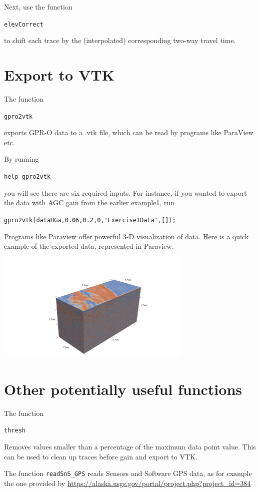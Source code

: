 \documentclass[11pt]{article}
\begin{document}
Next, use the function

\qquad \verb#elevCorrect#

to shift each trace by the (interpolated) corresponding two-way travel
time. 


\section{Export to VTK}

The function

\qquad \verb#gpro2vtk#

exports GPR-O data to a .vtk file, which can be
read by programs like ParaView etc.

By running

\qquad \verb#help gpro2vtk#

you will see there are six required inputs. For instance, if you
wanted to export the data with AGC gain from the earlier example1, run

\qquad \verb#gpro2vtk(dataHGa,0.06,0.2,0,'Exercise1Data',[]);#

Programs like Paraview offer powerful 3-D visualization of data.
Here is a quick example of the exported data, represented in Paraview.

\begin{center}
\includegraphics[width=0.7\textwidth, trim = 1cm 3cm 1cm
  3cm,clip]{figures/ParaviewEx.png}
\end{center}

\section{Other potentially useful functions}

The function

\qquad \verb#thresh#

Removes values smaller than a percentage of the maximum data point
value. This can be used to clean up traces before gain and export to VTK.

The function \verb#readSnS_GPS# reads Sensors and Software GPS data,
as for example the one provided by \url{https://alaska.usgs.gov/portal/project.php?project_id=384} 
\end{document}
